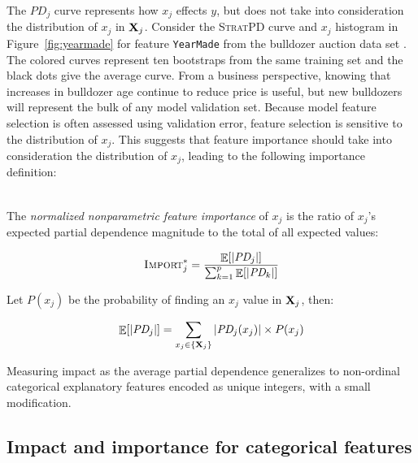 \documentclass[11pt]{article}
\newcommand{\figref}[1]{Figure~\ref{#1}}
\newcommand{\todo}[1]{{{\small\color{red}{[#1]}}}}
\DeclareMathOperator{\Ex}{\mathbb{E}}
\newcommand{\Impo}{\fontfamily{cmr}\textsc{Import}}
\newcommand{\spd}{\fontfamily{cmr}\textsc{\small StratPD}}
\begin{document}
The $PD_j$ curve represents how $x_j$ effects $y$, but does not take into consideration the distribution of $x_j$ in ${\bf X}_j$.  Consider the \spd{} curve and $x_j$ histogram in \figref{fig:yearmade} for feature {\tt\small YearMade} from the bulldozer auction data set \citep{bulldozer}. The colored curves represent ten bootstraps from the same training set and the black dots give the average curve.   From a business perspective, knowing that increases in bulldozer age continue to reduce price is useful, but new bulldozers will represent the bulk of any model validation set.  Because model feature selection is often assessed using  validation error, feature selection is sensitive to the distribution of $x_j$. This suggests that feature importance should take into consideration the distribution of $x_j$, leading to the following importance definition:

~\\
 The {\em normalized nonparametric feature importance} of $x_j$ is the ratio of $x_j$'s expected partial dependence magnitude to the total of all expected values:

\begin{equation}\label{eq:Epd3b}
\Impo_j^{*} = \frac{\Ex[|\text{\it PD}_j|]}{\sum_{k=1}^p \Ex[|\text{\it PD}_k|]}
\end{equation}

\noindent Let $P(x_j)$ be the probability of finding an $x_j$ value in ${\bf X}_j$, then:

\todo{comment out $P(x_j)$ as we might want.}

\begin{equation}\label{eq:Epd3c}
\Ex[|\text{\it PD}_j|] = \sum_{x_j \in \{{\bf X}_j\}} |\text{\it PD}_j(x_j)| \times P(x_j)
\end{equation}

Measuring impact as the average partial dependence generalizes to non-ordinal categorical explanatory features encoded as unique integers, with a small modification.  

\subsection{Impact and importance for categorical features}
\end{document}
